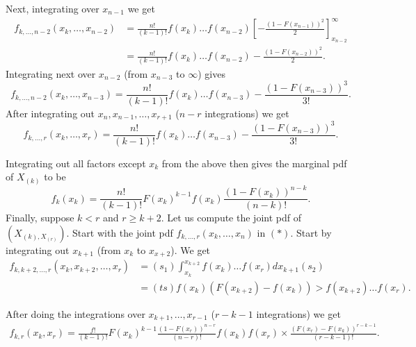 Next, integrating over $x_{n - 1}$ we get 
\begin{align*}
	f_{k, \ldots, n - 2}\left( x_{k} , \ldots , x_{n - 2} \right) &= \frac{n!}{\left( k - 1 \right) !} f\left( x_{k } \right) \ldots f \left( x _{n - 2} \right) \left[ - \frac{\left( 1 - F\left( x_{n -1} \right)  \right) ^2}{2} \right] ^{\infty}_{x _{n -2}}\\
								      &= \frac{n!}{\left( k - 1 \right) !} f\left( x_{k} \right) \ldots f \left( x_{n - 2} \right)  - \frac{\left( 1 - F\left( x_{n -2} \right)  \right) ^2}{2}
.\end{align*}
Integrating next over $x_{n - 2}$ (from $x_{n - 3}$ to $\infty$) gives 
\[
		f_{k, \ldots, n - 2}\left( x_{k} , \ldots , x_{n - 3} \right)=    \frac{n!}{\left( k - 1 \right) !} f\left( x_{k} \right) \ldots f \left( x_{n - 3} \right)  - \frac{\left( 1 - F\left( x_{n -3} \right)  \right) ^3}{3!}
.\] 
After integrating out $x_{n}, x_{n-1} , \ldots ,  x_{r+1}$ ($n - r$ integrations) we get 
\[
		f_{k, \ldots, r}\left( x_{k} , \ldots , x_{r} \right)=    \frac{n!}{\left( k - 1 \right) !} f\left( x_{k} \right) \ldots f \left( x_{n - 3} \right)  - \frac{\left( 1 - F\left( x_{n -3} \right)  \right) ^3}{3!}
.\] 


Integrating out all factors except $x_{k}$ from the above then gives the marginal pdf of $X_{\left( k \right) }$ to be 
\[
	f_{k}\left( x_k \right) = \frac{n!}{\left( k - 1 \right) !} F\left( x_{k} \right) ^{k - 1}f\left( x_{k} \right) \frac{\left( 1 - F\left( x_{k} \right)  \right) ^{n - k}}{\left( n - k \right) !}
.\] 
Finally, suppose $k < r$ and $r \ge  k + 2$. Let us compute the joint pdf of $\left( X_{\left( k \right) , X_{\left( r \right) }} \right) $. Start with the joint pdf $f_{k , \ldots, r}\left( x_{k} , \ldots , x_{n} \right) $ in $\left( * \right) $. Start by integrating out $x_{k + 1}$ (from $x_k$ to $x_{x + 2}$). We get 
\begin{align*}
	f_{k, k + 2, \ldots, r }\left( x_k, x_{k + 2}, \ldots, x _{r} \right) &= \left( s_1 \right) \int_{x_k}^{x_{k + 2}} f\left( x_k \right) \ldots f\left( x_r \right) dx_{k + 1} \left( s_2 \right) \\ 
									      &= \left( ts \right) f\left( x_k \right) \left( F\left( x_{k + 2} \right) - f\left( x_k \right)  \right) > f\left( x _{k + 2} \right) \ldots f \left( x_{r} \right)  
.\end{align*}

After doing the integrations over $x_{k+1} , \ldots , x_{r-1}$ ($r - k - 1$ integrations) we get 
\begin{align*}
	f_{k, r}\left( x_{k}, x_{r} \right) = \frac{f!}{\left( k - 1 \right) !}F\left( x_{k} \right) ^{k - 1} \frac{\left( 1 - F\left( x _{r} \right)  \right) ^{n - r}}{\left( n - r \right) !}f\left( x _{k} \right) f\left( x _{r} \right)  \times \frac{\left( F\left( x_{r} \right) - F\left( x_{k} \right)  \right) ^{r - k - 1}}{\left( r - k - 1 \right) !}
.\end{align*}
